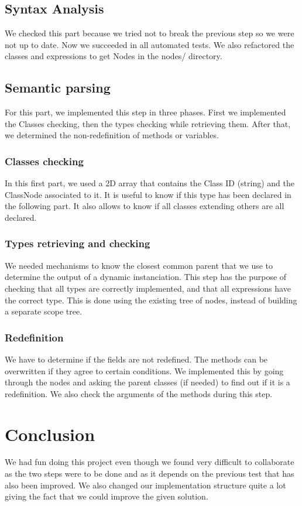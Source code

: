 \documentclass[a4paper,11pt]{article}
\begin{document}
\subsection{Syntax Analysis}
We checked this part because we tried not to break the previous step so we were not up to date. 
Now we succeeded in all automated tests. We also refactored the classes and expressions to get Nodes in the nodes/ directory.

\subsection{Semantic parsing}
For this part, we implemented this step in three phases. First we implemented the Classes checking, 
then the types checking while retrieving them. After that, we determined the non-redefinition of methods or variables.

\subsubsection{Classes checking}
In this first part, we used a 2D array that contains the Class ID (string) and the ClassNode 
associated to it. 
It is useful to know if this type has been declared in the following part. It also allows to 
know if all classes extending others are all declared.
  
\subsubsection{Types retrieving and checking}
We needed mechanisms to know the closest common parent that we use to determine the output 
of a dynamic instanciation. 
This step has the purpose of checking that all types are correctly implemented, and that all expressions have the correct type. This is done using the existing tree of nodes, instead of building a separate scope tree.

\subsubsection{Redefinition}
We have to determine if the  fields are not redefined. 
The methods can be overwritten if they agree to certain conditions. We implemented this by going through the nodes
and asking the parent classes (if needed) to find out if it is a redefinition.
We also check the arguments of the methods during this step.

\section{Conclusion}
We had fun doing this project even though we found very difficult to collaborate as the two steps were
to be done and as it depends on the previous test that has also been improved. We also changed our implementation
structure quite a lot giving the fact that we could improve the given solution.
\end{document}
